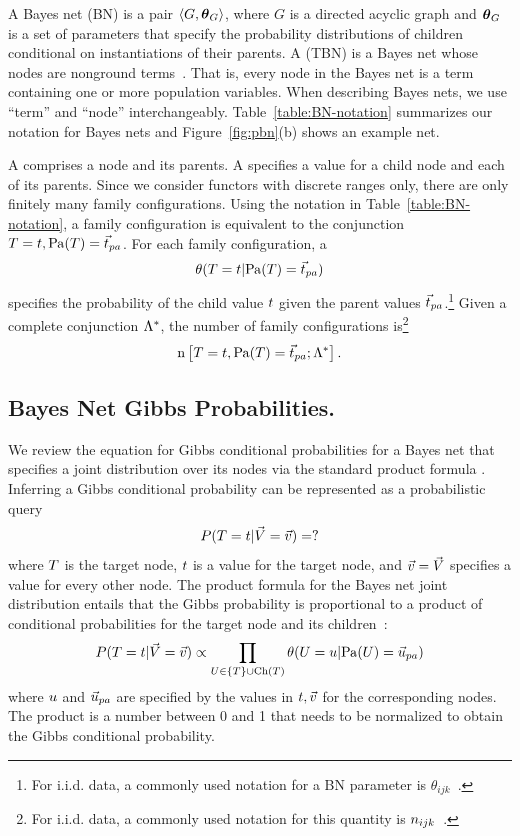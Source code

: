 \documentclass[twoside,11pt]{article}
\newcommand{\iid}{i.i.d.}
\begin{document}
A Bayes net (BN) is a pair
$\langle{G,\boldsymbol{\theta}_G}\rangle$, where $G$ is a directed acyclic graph and $\boldsymbol{\theta}_G$ is a set of parameters that specify the  probability distributions of children conditional on instantiations of their parents. A  (TBN) is a Bayes net whose nodes are nonground terms~\cite{Poole2003,Schulte2011}. That is, every node in the Bayes net is a term containing one or more population variables. When describing Bayes nets, we use ``term'' and ``node'' interchangeably. Table~\ref{table:BN-notation} summarizes our notation for Bayes nets and Figure~\ref{fig:pbn}(b) shows an example net.

A  comprises a node and its parents. A  specifies a value for a child node and each of its parents. Since we consider functors with discrete ranges only, there are only finitely many family configurations. Using the notation in Table~\ref{table:BN-notation}, a family configuration is equivalent to the conjunction $\TT=\TV,\Pa{\TT} = \Prange{\TT}$. For each family configuration, a  $$\cprob{\TT = \TV}{\Pa{\TT} = \Prange{\TT}}$$ specifies the probability of the child value $t$ given the parent values $\Prange{\TT}$.\footnote{For \iid{} data, a commonly  used notation for a BN parameter is $\theta_{ijk}$~\cite{Heckerman1998}.} Given a complete conjunction $\Lambda^{*}\hspace{0.0ex}$, the number of family configurations is\footnote{For \iid{} data, a commonly  used notation for this quantity is $n_{ijk}$~\cite{Heckerman1998}.} $$\Count{\TT=\TV,\Pa{\TT} = \Prange{\TT}}{\DB}.$$



\subsection{Bayes Net Gibbs Probabilities.}

We review the equation for Gibbs conditional probabilities for a Bayes net that specifies a joint distribution over its nodes via the standard product formula \cite{Pearl1988}. 
Inferring a Gibbs conditional probability can be represented as a probabilistic query
$$P(T = t | \vec{V} = \vec{v}) = ?$$
\noindent where $T$ is the target node, $t$ is a value for the target node, and $\vec{v} = \vec{V}$ specifies a value for every other node. The product formula for the Bayes net joint distribution entails that the Gibbs probability is proportional to a product of conditional probabilities for the target node and its children~\cite[Ch.14.5.2]{Russell2010}:  
\begin{equation} \label{eq:bn-mb-product}
\Gprob{\TT = \TV} {\VF = \VTuple} \propto \prod_{\UT \in \{\TT\} \cup \Ch{\TT}} \cprob{\UT = \UV}{\Pa{\UT} = \Prange{\UT}}
\end{equation}
where $u$ and $\Prange{\UT}$ are specified by the values in $t,\vec{v}$ for the corresponding nodes. The product is a number between 0 and 1 that needs to be normalized to obtain the Gibbs conditional probability.
\end{document}
